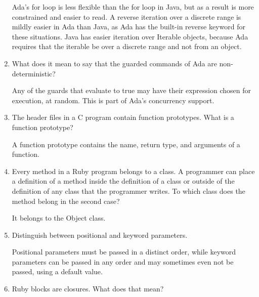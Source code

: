 \begin{enumerate}
  \begin{answer}
    Ada's for loop is less flexible than the for loop in Java, but as a result 
    is more constrained and easier to read. A reverse iteration over a discrete 
    range is mildly easier in Ada than Java, as Ada has the built-in reverse 
    keyword for these situations. Java has easier iteration over Iterable 
    objects, because Ada requires that the iterable be over a discrete range and 
    not from an object.
    \end{answer}

  \item What does it mean to say that the guarded commands
    of Ada are non-deterministic?

  \begin{answer}
    Any of the guards that evaluate to true may have their expression chosen for 
    execution, at random. This is part of Ada's concurrency support.
    \end{answer}

  \item The header files in a C program contain function
    prototypes. What is a function prototype?

  \begin{answer}
    A function prototype contains the name, return type, and arguments of a function.
    \end{answer}

  \item Every method in a Ruby program belongs to a class.
    A programmer can place a definition of a method inside
    the definition of a class or outside of the definition
    of any class that the programmer writes. To which class
    does the method belong in the second case?

  \begin{answer}
    It belongs to the Object class.
    \end{answer}

  \item Distinguish between positional and keyword parameters.

  \begin{answer}
    Positional parameters must be passed in a distinct order, while keyword 
    parameters can be passed in any order and may sometimes even not be passed,
    using a default value.
    \end{answer}

  \item Ruby blocks are closures. What does that mean?


\end{enumerate}
